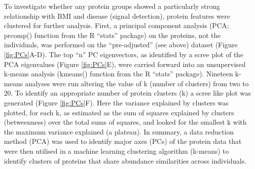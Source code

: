 \documentclass[11pt,twoside]{bristolthesis}
\begin{document}
To investigate whether any protein groups showed a particularly strong relationship with BMI and disease (signal detection), protein features were clustered for further analysis. First, a principal component analysis (PCA; prcomp() function from the R ``stats'' package) on the proteins, not the individuals, was performed on the ``pre-adjusted'' (see above) dataset (Figure \ref{fig:PCs}A-D). The top ``n'' PC eigenvectors, as identified by a scree plot of the PCA eigenvalues (Figure \ref{fig:PCs}E), were carried forward into an unsupervised k-means analysis (kmeans() function from the R ``stats'' package). Nineteen k-means analyses were run altering the value of k (number of clusters) from two to 20. To identify an appropriate number of protein clusters (k) a scree like plot was generated (Figure \ref{fig:PCs}F). Here the variance explained by clusters was plotted, for each k, as estimated as the sum of squares explained by clusters (betweenness) over the total sums of squares, and looked for the smallest k with the maximum variance explained (a plateau). In summary, a data reduction method (PCA) was used to identify major axes (PCs) of the protein data that were then utilised in a machine learning clustering algorithm (k-means) to identify clusters of proteins that share abundance similarities across individuals.
\end{document}
